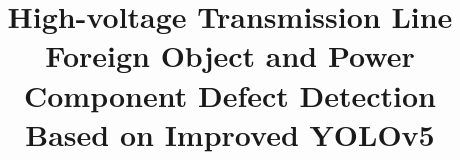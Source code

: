 \documentclass[sn-mathphys,Numbered]{sn-jnl}%
\theoremstyle{thmstyleone}%
\theoremstyle{thmstyletwo}%
\theoremstyle{thmstylethree}%
\begin{document}
\title[Article Title]{High-voltage Transmission Line Foreign Object and Power Component Defect Detection Based on Improved YOLOv5}











\end{document}

